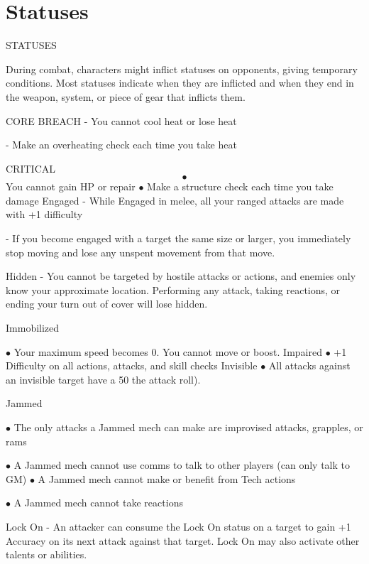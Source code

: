 \section{Statuses}

  STATUSES  

During combat, characters might inflict statuses on opponents, giving temporary conditions. Most  
statuses indicate when they are inflicted and when they end in the weapon, system, or piece of  
gear that inflicts them.  

CORE BREACH  
    -   You cannot cool heat or lose heat
 
    -   Make an overheating check each time you take heat
 
CRITICAL  
    $$\bullet$$   You cannot gain HP or repair  
    $\bullet$    Make a structure check each time you take damage  
Engaged  
    -   While Engaged in melee, all your ranged attacks are made with +1 difficulty
 
    -   If you become engaged with a target the same size or larger, you immediately stop  
        moving and lose any unspent movement from that move.
 
Hidden  
    -   You cannot be targeted by hostile attacks or actions, and enemies only know your  
        approximate location. Performing any attack, taking reactions, or ending your turn out of  
        cover will lose hidden.
 
Immobilized 
 
    $\bullet$    Your maximum speed becomes 0. You cannot move or boost.  
Impaired  
    $\bullet$    +1 Difficulty on all actions, attacks, and skill checks  
Invisible  
    $\bullet$    All attacks against an invisible target have a 50%
        the attack roll).
 
Jammed 
 
    $\bullet$    The only attacks a Jammed mech can make are improvised attacks, grapples, or rams
 
    $\bullet$    A Jammed mech cannot use comms to talk to other players (can only talk to GM)   
    $\bullet$    A Jammed mech cannot make or benefit from Tech actions
 
    $\bullet$    A Jammed mech cannot take reactions
 
Lock On  
    -   An attacker can consume the Lock On status on a target to gain +1 Accuracy on its next  
        attack against that target. Lock On may also activate other talents or abilities.
 
